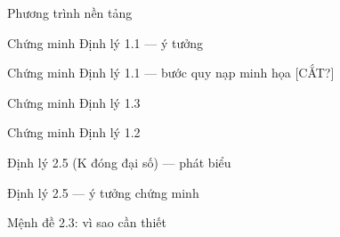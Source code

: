 \begin{frame}{Phương trình nền tảng}
\note{
}
\end{frame}


\begin{frame}{Chứng minh Định lý 1.1 — ý tưởng}
\note{
}
\end{frame}

\begin{frame}{Chứng minh Định lý 1.1 — bước quy nạp minh họa [CẮT?]}
\note{
}
\end{frame}

\begin{frame}{Chứng minh Định lý 1.3}
\note{
}
\end{frame}

\begin{frame}{Chứng minh Định lý 1.2}
\note{
}
\end{frame}

\begin{frame}{Định lý 2.5 (K đóng đại số) — phát biểu}
\note{
}
\end{frame}

\begin{frame}{Định lý 2.5 — ý tưởng chứng minh}
\note{
}
\end{frame}


\begin{frame}{Mệnh đề 2.3: vì sao cần thiết}
\note{
}
\end{frame}

